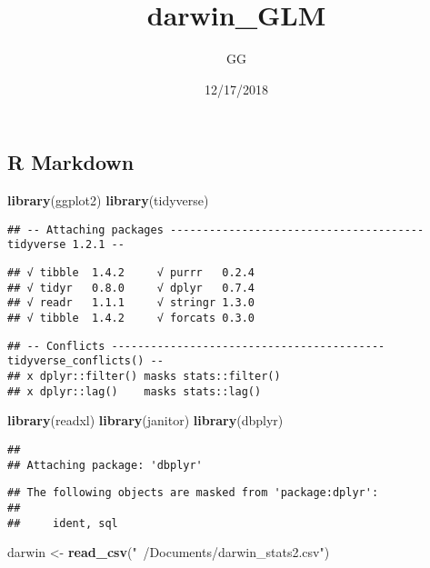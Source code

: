 \documentclass[]{article}
\title{darwin\_GLM}
\author{GG}
\date{12/17/2018}
\newenvironment{Shaded}{\begin{snugshade}}{\end{snugshade}}
\newcommand{\KeywordTok}[1]{\textcolor[rgb]{0.13,0.29,0.53}{\textbf{#1}}}
\newcommand{\StringTok}[1]{\textcolor[rgb]{0.31,0.60,0.02}{#1}}
\newcommand{\NormalTok}[1]{#1}
\begin{document}
\maketitle

\subsection{R Markdown}\label{r-markdown}

\begin{Shaded}
\begin{Highlighting}[]
\KeywordTok{library}\NormalTok{(ggplot2)}
\KeywordTok{library}\NormalTok{(tidyverse)}
\end{Highlighting}
\end{Shaded}

\begin{verbatim}
## -- Attaching packages --------------------------------------- tidyverse 1.2.1 --
\end{verbatim}

\begin{verbatim}
## √ tibble  1.4.2     √ purrr   0.2.4
## √ tidyr   0.8.0     √ dplyr   0.7.4
## √ readr   1.1.1     √ stringr 1.3.0
## √ tibble  1.4.2     √ forcats 0.3.0
\end{verbatim}

\begin{verbatim}
## -- Conflicts ------------------------------------------ tidyverse_conflicts() --
## x dplyr::filter() masks stats::filter()
## x dplyr::lag()    masks stats::lag()
\end{verbatim}

\begin{Shaded}
\begin{Highlighting}[]
\KeywordTok{library}\NormalTok{(readxl)}
\KeywordTok{library}\NormalTok{(janitor)}
\KeywordTok{library}\NormalTok{(dbplyr)}
\end{Highlighting}
\end{Shaded}

\begin{verbatim}
## 
## Attaching package: 'dbplyr'
\end{verbatim}

\begin{verbatim}
## The following objects are masked from 'package:dplyr':
## 
##     ident, sql
\end{verbatim}

\begin{Shaded}
\begin{Highlighting}[]
\NormalTok{darwin <-}\StringTok{ }\KeywordTok{read_csv}\NormalTok{(}\StringTok{"~/Documents/darwin_stats2.csv"}\NormalTok{)}
\end{Highlighting}
\end{Shaded}
\end{document}
